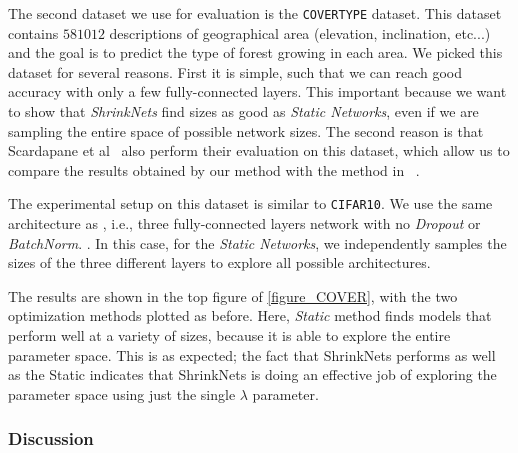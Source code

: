 The second dataset we use for evaluation is the \texttt{COVERTYPE} \cite{Blackard:1998:CNN:928509} dataset. This dataset
contains $581012$ descriptions of geographical area (elevation, inclination,
etc...) and the goal is to predict the type of forest growing in each area. We picked
this dataset for several reasons. First it is simple, such that we can reach good
accuracy with only a few fully-connected layers. This important because we want to show that
\textit{ShrinkNets} find sizes as good as \textit{Static Networks}, even if we
are sampling the entire space of possible network sizes. The second reason is that Scardapane et al~\cite{Scardapane2017}
also perform their evaluation on this dataset, which allow us to compare the
results obtained by our method with the method in ~\cite{Scardapane2017}.

The experimental setup on this dataset is similar to {\tt CIFAR10}. We use the same architecture
as \cite{Scardapane2017}, i.e., three fully-connected layers network with  no
\textit{Dropout} \cite{Srivastava2014} or \textit{BatchNorm}. . In this case, for the \textit{Static Networks}, we 
independently samples the sizes of the three different layers to explore all possible
architectures.

The results are shown in the top figure of \cref{figure_COVER}, with the two optimization methods plotted as before. Here, {\it Static} method finds models that perform well at a variety of sizes, because it is able to explore the entire parameter space.  This is as expected;  the fact that ShrinkNets performs as well as the Static indicates that ShrinkNets is doing an effective job of exploring the parameter space using just the single $\lambda$ parameter.  

\subsubsection{Discussion}

